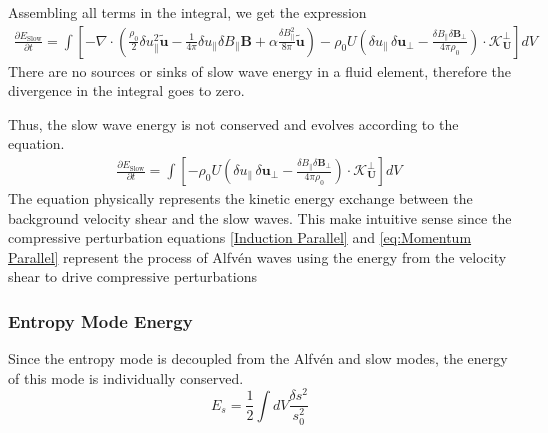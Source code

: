 Assembling all terms in the integral, we get the expression 
\begin{equation*}
   \begin{split}
        \frac{\partial E_{\mathrm{Slow}}}{\partial t} = \int \left[ - \nabla\cdot\left( \frac{\rho_{0}}{2}\delta u_{\parallel}^2  \tilde{\boldsymbol{u}} -\frac{1}{4\pi}\delta u_{\parallel}\delta B_{\parallel} \boldsymbol{B} +\alpha \frac{\delta B_{\parallel}^2}{8\pi}  \tilde{\boldsymbol{u}}\right) -\rho_0 U(\delta u_{\parallel}\,\delta \boldsymbol{u}_{\perp}- \frac{\delta B_{\parallel} \delta \boldsymbol{B}_{\perp}}{4\pi \rho_0} ) \cdot \boldsymbol{\mathcal{K}^{\perp}_{U}} \right] dV
   \end{split}
\end{equation*}
There are no sources or sinks of slow wave energy in a fluid element, therefore the divergence in the integral goes to zero.

Thus, the slow wave energy is not conserved and evolves according to the equation.
\begin{equation}
   \begin{split}
        \frac{\partial E_{\mathrm{Slow}}}{\partial t} = \int \left[
        -\rho_0 U\left(\delta u_{\parallel}\,\delta \boldsymbol{u}_{\perp}- \frac{\delta B_{\parallel} \delta \boldsymbol{B}_{\perp}}{4\pi \rho_0} \right) \cdot \boldsymbol{\mathcal{K}^{\perp}_{U}} \right] dV\, 
   \end{split}
\end{equation}
The equation physically represents the kinetic energy exchange between the background velocity shear and the slow waves. This make intuitive sense since  the compressive perturbation equations \eqref{Induction Parallel} and \eqref{eq:Momentum Parallel} represent the process of Alfv\'en waves using the energy from the velocity shear to drive compressive perturbations


\subsubsection{Entropy Mode Energy}
Since the entropy mode is decoupled from the Alfv\'en and slow modes, the energy of this mode is individually conserved.
\begin{equation*}
    E_{s} = \frac{1}{2} \int dV \frac{\delta s^{2}}{s_{0}^{2}}
\end{equation*}

